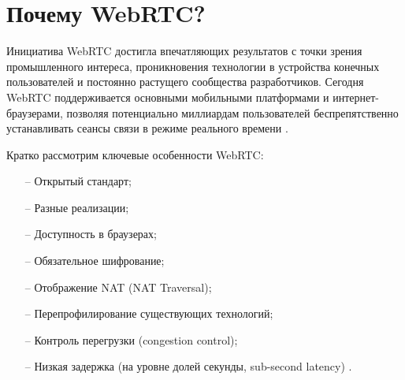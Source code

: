 \section{Почему WebRTC?}

Инициатива WebRTC достигла впечатляющих результатов с точки зрения промышленного интереса, проникновения технологии в устройства конечных пользователей и постоянно растущего сообщества разработчиков. Сегодня WebRTC поддерживается основными мобильными платформами и интернет-браузерами, позволяя потенциально миллиардам пользователей беспрепятственно устанавливать сеансы связи в режиме реального времени \cite{v2}.

Кратко рассмотрим ключевые особенности WebRTC:
\begin{itemize}
	\item[--] Открытый стандарт;
	\item[--] Разные реализации;
	\item[--] Доступность в браузерах;
        \item[--] Обязательное шифрование;
        \item[--] Отображение NAT (NAT Traversal);
        \item[--] Перепрофилирование существующих технологий;
        \item[--] Контроль перегрузки (congestion control);
        \item[--] Низкая задержка (на уровне долей секунды, sub-second latency) \cite{v3}.
\end{itemize}

\pagebreak
